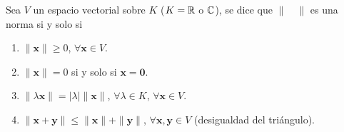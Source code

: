 \begin{definition}
    Sea $V$ un espacio vectorial sobre $K$ ($K = \RR$ o $\CC$), se dice que $\| \quad \|$ es una norma si y solo si
    \begin{enumerate}[label=\roman*.]
        \item $\| \mathbf{x} \| \geq 0$, $\forall \mathbf{x} \in V$.
        \item $\| \mathbf{x} \| = 0$ si y solo si $\mathbf{x} = \mathbf{0}$.
        \item $\| \lambda \mathbf{x} \| = |\lambda| \| \mathbf{x} \|$, $\forall \lambda \in K$, $\forall \mathbf{x} \in V$.
        \item $\| \mathbf{x} + \mathbf{y} \| \leq \| \mathbf{x} \| + \| \mathbf{y} \|$, $\forall \mathbf{x}, \mathbf{y} \in V$ (desigualdad del triángulo).
    \end{enumerate}
\end{definition}